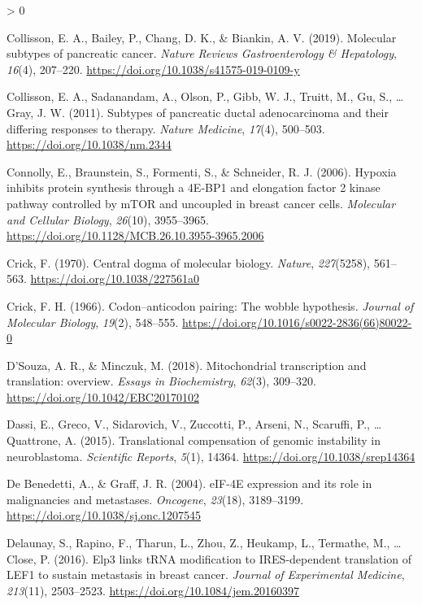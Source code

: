 \documentclass[
  12pt,
  openany]{book}
\newlength{\cslhangindent}
\newenvironment{CSLReferences}[2] %
 {%
  \setlength{\parindent}{0pt}
  \ifodd #1 \everypar{\setlength{\hangindent}{\cslhangindent}}\ignorespaces\fi
  \ifnum #2 > 0
  \setlength{\parskip}{#2\baselineskip}
  \fi
 }%
 {}
\begin{document}
\begin{CSLReferences}{1}{0}
\leavevmode\hypertarget{ref-Collisson2019}{}%
Collisson, E. A., Bailey, P., Chang, D. K., \& Biankin, A. V. (2019). Molecular subtypes of pancreatic cancer. \emph{Nature Reviews Gastroenterology \& Hepatology}, \emph{16}(4), 207--220. \url{https://doi.org/10.1038/s41575-019-0109-y}

\leavevmode\hypertarget{ref-Collisson2011}{}%
Collisson, E. A., Sadanandam, A., Olson, P., Gibb, W. J., Truitt, M., Gu, S., \ldots{} Gray, J. W. (2011). Subtypes of pancreatic ductal adenocarcinoma and their differing responses to therapy. \emph{Nature Medicine}, \emph{17}(4), 500--503. \url{https://doi.org/10.1038/nm.2344}

\leavevmode\hypertarget{ref-Connolly2006}{}%
Connolly, E., Braunstein, S., Formenti, S., \& Schneider, R. J. (2006). Hypoxia inhibits protein synthesis through a 4E-{BP}1 and elongation factor 2 kinase pathway controlled by {mTOR} and uncoupled in breast cancer cells. \emph{Molecular and Cellular Biology}, \emph{26}(10), 3955--3965. \url{https://doi.org/10.1128/MCB.26.10.3955-3965.2006}

\leavevmode\hypertarget{ref-Crick1970}{}%
Crick, F. (1970). Central dogma of molecular biology. \emph{Nature}, \emph{227}(5258), 561--563. \url{https://doi.org/10.1038/227561a0}

\leavevmode\hypertarget{ref-Crick1966}{}%
Crick, F. H. (1966). Codon--anticodon pairing: The wobble hypothesis. \emph{Journal of Molecular Biology}, \emph{19}(2), 548--555. \url{https://doi.org/10.1016/s0022-2836(66)80022-0}

\leavevmode\hypertarget{ref-DSouza2018}{}%
D'Souza, A. R., \& Minczuk, M. (2018). Mitochondrial transcription and translation: overview. \emph{Essays in Biochemistry}, \emph{62}(3), 309--320. \url{https://doi.org/10.1042/EBC20170102}

\leavevmode\hypertarget{ref-Dassi2015}{}%
Dassi, E., Greco, V., Sidarovich, V., Zuccotti, P., Arseni, N., Scaruffi, P., \ldots{} Quattrone, A. (2015). Translational compensation of genomic instability in neuroblastoma. \emph{Scientific Reports}, \emph{5}(1), 14364. \url{https://doi.org/10.1038/srep14364}

\leavevmode\hypertarget{ref-DeBenedetti2004}{}%
De Benedetti, A., \& Graff, J. R. (2004). {eIF}-4E expression and its role in malignancies and metastases. \emph{Oncogene}, \emph{23}(18), 3189--3199. \url{https://doi.org/10.1038/sj.onc.1207545}

\leavevmode\hypertarget{ref-Delaunay2016}{}%
Delaunay, S., Rapino, F., Tharun, L., Zhou, Z., Heukamp, L., Termathe, M., \ldots{} Close, P. (2016). Elp3 links {tRNA} modification to {IRES}-dependent translation of {LEF}1 to sustain metastasis in breast cancer. \emph{Journal of Experimental Medicine}, \emph{213}(11), 2503--2523. \url{https://doi.org/10.1084/jem.20160397}


\end{CSLReferences}
\end{document}
